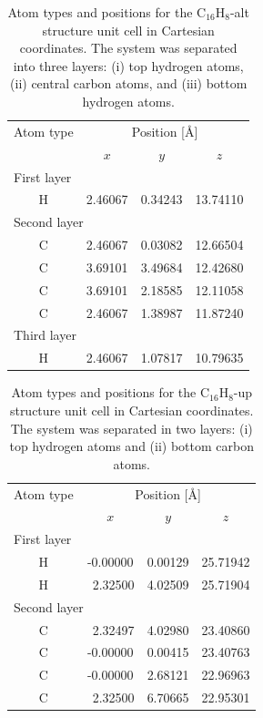 \documentclass[pss]{wiley2sp} %
\begin{document}
\begin{table}[t]
\begin{tabular}{cccc}
\hline
\hline
Atom type &  \multicolumn{3}{c}{Position [\AA] } \\
\cline{2-4}
& $x$ & $y$ & $z$ \\
\hline
\multicolumn{2}{l}{First layer}\\
H & 2.46067 & 0.34243 & 13.74110 \\
\multicolumn{2}{l}{Second layer}\\
C & 2.46067 & 0.03082 & 12.66504 \\
C & 3.69101 & 3.49684 & 12.42680 \\
C & 3.69101 & 2.18585 & 12.11058 \\
C & 2.46067 & 1.38987 & 11.87240 \\
\multicolumn{2}{l}{Third layer}\\
H & 2.46067 & 1.07817 & 10.79635 \\
\hline
\hline
\end{tabular}
\caption[]{%
Atom types and positions for the C$_{16}$H$_{8}$-alt structure unit cell in
Cartesian coordinates. The system was separated into three layers: (i) top
hydrogen atoms, (ii) central carbon atoms, and (iii) bottom hydrogen atoms.
\label{tab:altstrc}}
\end{table}
\begin{table}[t]
\begin{tabular}{cccc}
\hline
\hline
Atom type &  \multicolumn{3}{c}{Position [\AA]} \\
\cline{2-4}
& $x$ & $y$ & $z$ \\
\hline
\multicolumn{2}{l}{First layer}\\
H &  -0.00000 & 0.00129 & 25.71942 \\
H & \ 2.32500 & 4.02509 & 25.71904 \\
\multicolumn{2}{l}{Second layer}\\
C & \ 2.32497 & 4.02980 & 23.40860 \\
C &  -0.00000 & 0.00415 & 23.40763 \\
C &  -0.00000 & 2.68121 & 22.96963 \\
C & \ 2.32500 & 6.70665 & 22.95301 \\
\hline
\hline
\end{tabular}
\caption[]{%
Atom types and positions for the C$_{16}$H$_{8}$-up structure unit cell in
Cartesian coordinates. The system was separated in two layers: (i) top
hydrogen atoms and (ii) bottom carbon atoms.}
\label{tab:upstrc}
\end{table}
\end{document}

